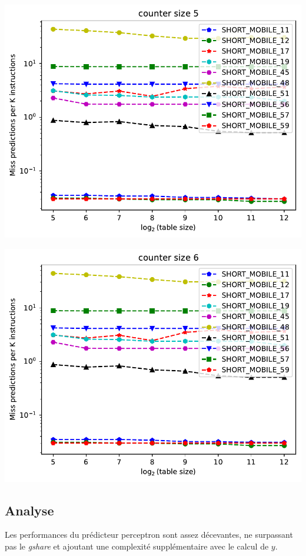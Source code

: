 \documentclass[a4paper]{article}
\begin{document}
\begin{minipage}{.48\linewidth}
\includegraphics[width=\linewidth]{perceptron/graph_5}
\end{minipage}%
\hfill
\begin{minipage}{.48\linewidth}
\includegraphics[width=\linewidth]{perceptron/graph_6}
\end{minipage}
\subsection{Analyse}
Les performances du prédicteur perceptron sont assez décevantes, ne surpassant pas le \textit{gshare} et ajoutant une complexité supplémentaire avec le calcul de $y$.
\end{document}
